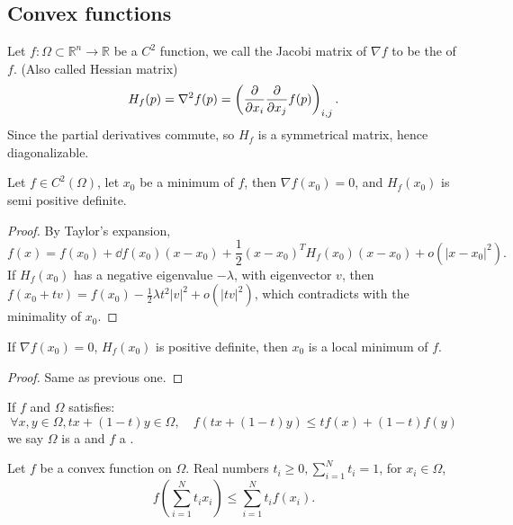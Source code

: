 \subsection{Convex functions}
\label{sub:Convex functions}
\begin{definition}
	Let $f: \Omega \subset\mathbb{R}^{n}\to \mathbb{R}$ be a $C^2$ function,
	we call the Jacobi matrix of $\nabla f$ to be the  of $f$.
	(Also called Hessian matrix)
	\[
	H_f(p) = \nabla^2 f(p) = \left(\frac{\partial }{\partial x_i}\frac{\partial }{\partial x_j}f(p)\right)_{i,j}.
	\]
	Since the partial derivatives commute, so $H_f$ is a symmetrical matrix,
	hence diagonalizable.
\end{definition}

\begin{proposition}
	Let $f\in C^2(\Omega)$, let $x_0$ be a minimum of $f$,
	then $\nabla f(x_0) = 0$, and $H_f(x_0)$ is semi positive definite.
\end{proposition}
\begin{proof}[Proof]
    By Taylor's expansion,
	\[
	f(x) = f(x_0) + \dd f(x_0) (x - x_0) + \frac{1}{2}(x-x_0)^TH_f(x_0)(x-x_0)
	+ o(|x - x_0|^2).
	\]
	If $H_f(x_0)$ has a negative eigenvalue $-\lambda$, with
	eigenvector $v$,
	then $f(x_0 + tv) = f(x_0) - \frac{1}{2} \lambda t^2 |v|^2 + o(|tv|^2)$,
	which contradicts with the minimality of $x_0$.
\end{proof}

\begin{proposition}
	If $\nabla f(x_0) = 0$, $H_f(x_0)$ is positive definite,
	then $x_0$ is a local minimum of $f$.
\end{proposition}
\begin{proof}[Proof]
    Same as previous one.
\end{proof}

\begin{definition}
	If $f$ and $\Omega$ satisfies:
	\[
	\forall x,y\in \Omega, tx + (1-t)y \in \Omega, \quad
	f(tx + (1-t)y) \le tf(x) + (1-t) f(y)
	\]
	we say $\Omega$ is a  and $f$ a .
\end{definition}

\begin{theorem}
    Let $f$ be a convex function on $\Omega$.
	Real numbers $t_i\ge 0, \sum_{i=1}^{N} t_i = 1$, for $x_i\in \Omega$,
	\[
	f\left(\sum_{i=1}^N t_i x_i\right) \le \sum_{i=1}^{N} t_if(x_i).
	\]
\end{theorem}

